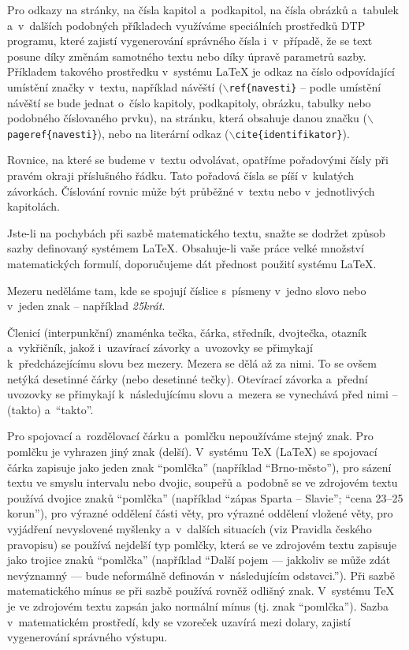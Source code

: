 Pro odkazy na stránky, na čísla kapitol a~podkapitol, na čísla obrázků a~tabulek a~v~dalších podobných příkladech využíváme speciálních prostředků DTP programu, které zajistí vygenerování správného čísla i~v~případě, že se text posune díky změnám samotného textu nebo díky úpravě parametrů sazby. Příkladem takového prostředku v~systému LaTeX je odkaz na číslo odpovídající umístění značky v~textu, například návěští ($\backslash${\tt ref\{navesti\}} -- podle umístění návěští se bude jednat o~číslo kapitoly, podkapitoly, obrázku, tabulky nebo podobného číslovaného prvku), na stránku, která obsahuje danou značku ($\backslash${\tt pageref\{navesti\}}), nebo na literární odkaz ($\backslash${\tt cite\{identifikator\}}).

Rovnice, na které se budeme v~textu odvolávat, opatříme pořadovými čísly při pravém okraji příslušného řádku. Tato pořadová čísla se píší v~kulatých závorkách. Číslování rovnic může být průběžné v~textu nebo v~jednotlivých kapitolách.

Jste-li na pochybách při sazbě matematického textu, snažte se dodržet způsob sazby definovaný systémem LaTeX. Obsahuje-li vaše práce velké množství matematických formulí, doporučujeme dát přednost použití systému LaTeX.

Mezeru neděláme tam, kde se spojují číslice s~písmeny v~jedno slovo nebo v~jeden znak -- například {\it 25krát}.

Členicí (interpunkční) znaménka tečka, čárka, středník, dvojtečka, otazník a~vykřičník, jakož i~uzavírací závorky a~uvozovky se přimykají k~předcházejícímu slovu bez mezery. Mezera se dělá až za nimi. To se ovšem netýká desetinné čárky (nebo desetinné tečky). Otevírací závorka a~přední uvozovky se přimykají k~následujícímu slovu a~mezera se vynechává před nimi -- (takto) a~``takto''.

Pro spojovací a~rozdělovací čárku a~pomlčku nepoužíváme stejný znak. Pro pomlčku je vyhrazen jiný znak (delší). V~systému TeX (LaTeX) se spojovací čárka zapisuje jako jeden znak ``pomlčka'' (například ``Brno-město''), pro sázení textu ve smyslu intervalu nebo dvojic, soupeřů a~podobně se ve zdrojovém textu používá dvojice znaků ``pomlčka'' (například ``zápas Sparta -- Slavie''; ``cena 23--25 korun''), pro výrazné oddělení části věty, pro výrazné oddělení vložené věty, pro vyjádření nevyslovené myšlenky a~v~dalších situacích (viz Pravidla českého pravopisu) se používá nejdelší typ pomlčky, která se ve zdrojovém textu zapisuje jako trojice znaků ``pomlčka'' (například ``Další pojem --- jakkoliv se může zdát nevýznamný --- bude neformálně definován v~následujícím odstavci.''). Při sazbě matematického mínus se při sazbě používá rovněž odlišný znak. V~systému TeX je ve zdrojovém textu zapsán jako normální mínus (tj. znak ``pomlčka''). Sazba v~matematickém prostředí, kdy se vzoreček uzavírá mezi dolary, zajistí 
vygenerování správného výstupu.

